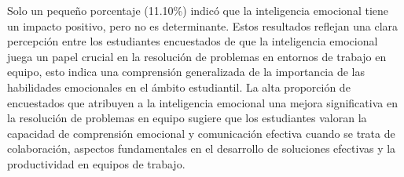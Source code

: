 \documentclass[journal]{IEEEtran}
\begin{document}
\begin{enumerate}
{Solo un pequeño porcentaje (11.10\%) indicó que la inteligencia emocional tiene un impacto positivo, pero no es determinante.
Estos resultados reflejan una clara percepción entre los estudiantes encuestados de que la inteligencia emocional juega un papel crucial en la resolución de problemas en entornos de trabajo en equipo, esto indica una comprensión generalizada de la importancia de las habilidades emocionales en el ámbito estudiantil.
La alta proporción de encuestados que atribuyen a la inteligencia emocional una mejora significativa en la resolución de problemas en equipo sugiere que los estudiantes valoran la capacidad de comprensión emocional y comunicación efectiva cuando se trata de colaboración, aspectos fundamentales en el desarrollo de soluciones efectivas y la productividad en equipos de trabajo.
}\\


\end{enumerate}
\end{document}
